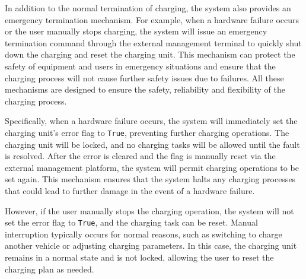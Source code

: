 \documentclass[
english,
ruledheaders=section,%
class=report,%
thesis={type=Report},%
accentcolor=9c,%
custommargins=true,%
marginpar=false,%
parskip=half-,%
fontsize=11pt,%
logofile={img/tuda_logo.pdf}, %
]{tudapub}
\begin{document}
\begin{enumerate}[label=\Alph*.]

        In addition to the normal termination of charging, the system also provides an emergency termination mechanism. For example, when a hardware failure occurs or the user manually stops charging, the system will issue an emergency termination command through the external management terminal to quickly shut down the charging and reset the charging unit. This mechanism can protect the safety of equipment and users in emergency situations and ensure that the charging process will not cause further safety issues due to failures. All these mechanisms are designed to ensure the safety, reliability and flexibility of the charging process.


        Specifically, when a hardware failure occurs, the system will immediately set the charging unit's error flag to \texttt{True}, preventing further charging operations. The charging unit will be locked, and no charging tasks will be allowed until the fault is resolved. After the error is cleared and the flag is manually reset via the external management platform, the system will permit charging operations to be set again. This mechanism ensures that the system halts any charging processes that could lead to further damage in the event of a hardware failure.


        However, if the user manually stops the charging operation, the system will not set the error flag to \texttt{True}, and the charging task can be reset. Manual interruption typically occurs for normal reasons, such as switching to charge another vehicle or adjusting charging parameters. In this case, the charging unit remains in a normal state and is not locked, allowing the user to reset the charging plan as needed.

    \end{enumerate}
\end{document}
